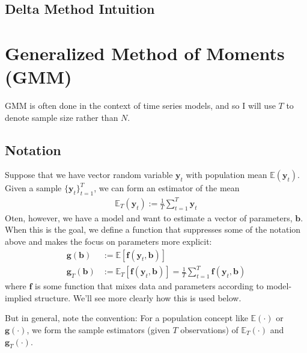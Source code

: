\documentclass[12pt]{article}
\theoremstyle{plain}
\theoremstyle{definition}
\theoremstyle{remark}
\begin{document}
\subsection{Delta Method Intuition}

\clearpage
\section{Generalized Method of Moments (GMM)}

GMM is often done in the context of time series models, and so I will
use $T$ to denote sample size rather than $N$.

\subsection{Notation}

Suppose that we have vector random variable $\boldsymbol{y}_t$ with
population mean $\mathbb{E}(\boldsymbol{y}_t)$. Given a sample
$\{\boldsymbol{y}_t\}^T_{t=1}$, we can form an estimator of the mean
\begin{align*}
  \mathbb{E}_T(\boldsymbol{y}_t)
  := \frac{1}{T} \sum^T_{t=1} \boldsymbol{y}_t
\end{align*}
Oten, however, we have a model and want to estimate a vector of
parameters, $\boldsymbol{b}$. When this is the goal, we define a function
that suppresses some of the notation above and makes the focus on
parameters more explicit:
\begin{align*}
  \boldsymbol{g}(\boldsymbol{b})
  &:= \mathbb{E}[\boldsymbol{f}(\boldsymbol{y}_t,\boldsymbol{b})]\\
  \boldsymbol{g}_T(\boldsymbol{b})
  &:= \mathbb{E}_T[\boldsymbol{f}(\boldsymbol{y}_t,\boldsymbol{b})]
  = \frac{1}{T}\sum^T_{t=1}
      \boldsymbol{f}(\boldsymbol{y}_t,\boldsymbol{b})
\end{align*}
where $\boldsymbol{f}$ is some function that mixes data and parameters
according to model-implied structure. We'll see more clearly how this is
used below.

But in general, note the convention: For a population concept like
$\mathbb{E}(\cdot)$ or $\boldsymbol{g}(\cdot)$, we form the sample
estimators (given $T$ observations) of $\mathbb{E}_T(\cdot)$ and
$\boldsymbol{g}_T(\cdot)$.
\end{document}
